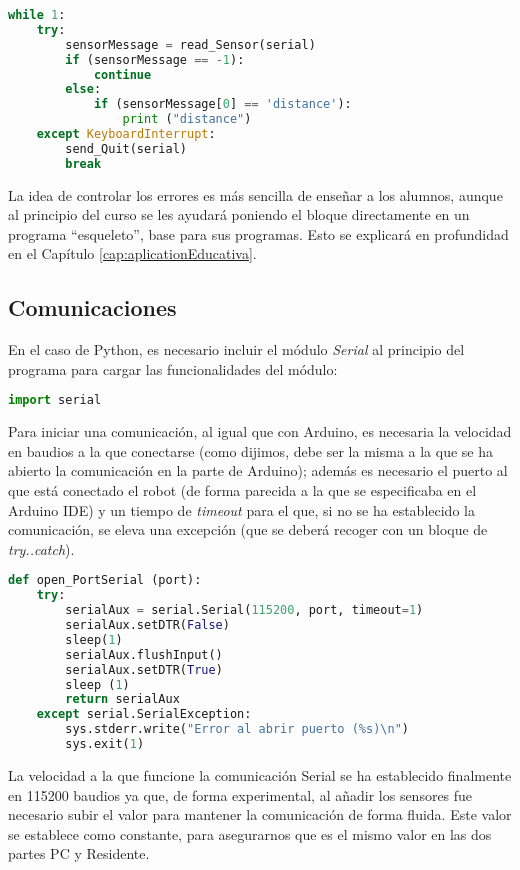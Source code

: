 \begin{lstlisting}[language=python,caption={Ejemplo de finalización de programa con control de errores}]
while 1:
	try:
		sensorMessage = read_Sensor(serial)    
		if (sensorMessage == -1):
			continue
		else:
			if (sensorMessage[0] == 'distance'):
				print ("distance")
	except KeyboardInterrupt:
		send_Quit(serial)
		break
\end{lstlisting}


La idea de controlar los errores es más sencilla de enseñar a los alumnos, aunque al principio del curso se les ayudará poniendo el bloque directamente en un programa ``esqueleto'', base para sus programas. Esto se explicará en profundidad en el Capítulo \ref{cap:aplicationEducativa}.


\subsection{Comunicaciones}\label{subsec:comunicacionesPython}

En el caso de Python, es necesario incluir el módulo \textit{Serial} al principio del programa para cargar las funcionalidades del módulo:
\begin{lstlisting}[language=python]
import serial
\end{lstlisting}

Para iniciar una comunicación, al igual que con Arduino, es necesaria la velocidad en baudios a la que conectarse (como dijimos, debe ser la misma a la que se ha abierto la comunicación en la parte de Arduino); además es necesario el puerto al que está conectado el robot (de forma parecida a la que se especificaba en el Arduino IDE) y un tiempo de \textit{timeout} para el que, si no se ha establecido la comunicación, se eleva una excepción (que se deberá recoger con un bloque de \textit{try..catch}). 
\begin{lstlisting}[language=python,caption={Función de la biblioteca Python para abrir el puerto serie}]	
def open_PortSerial (port):
	try:
		serialAux = serial.Serial(115200, port, timeout=1)
		serialAux.setDTR(False)
		sleep(1)
		serialAux.flushInput()
		serialAux.setDTR(True)
		sleep (1)
		return serialAux
	except serial.SerialException:
		sys.stderr.write("Error al abrir puerto (%s)\n")
		sys.exit(1)
\end{lstlisting}

La velocidad a la que funcione la comunicación Serial se ha establecido finalmente en 115200 baudios ya que, de forma experimental, al añadir los sensores fue necesario subir el valor para mantener la comunicación de forma fluida. Este valor se establece como constante, para asegurarnos que es el mismo valor en las dos partes PC y Residente. 

